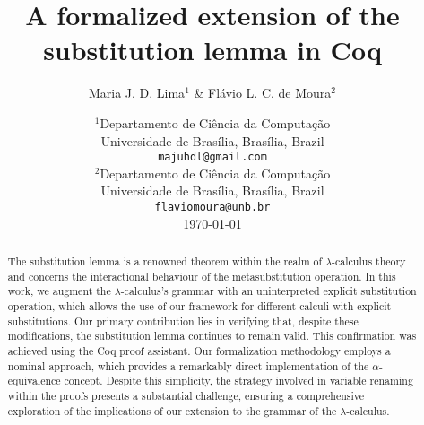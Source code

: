 \documentclass[12pt]{article}
\title{A formalized extension of the substitution lemma in Coq}
\author{Maria J. D. Lima$^1$ \&  Flávio L. C. de Moura$^2$}
\date{$^1$Departamento de Ciência da Computação \\
    Universidade de Brasília, Brasília, Brazil \\
  \texttt{majuhdl@gmail.com} \\
  $^2$Departamento de Ciência da Computação \\
    Universidade de Brasília, Brasília, Brazil \\
  \texttt{flaviomoura@unb.br} \\ \today}
\begin{document}
\maketitle

\begin{abstract}
  The substitution lemma is a renowned theorem within the realm of $\lambda$-calculus theory and concerns the interactional behaviour of the metasubstitution operation. In this work, we augment the $\lambda$-calculus's grammar with an uninterpreted explicit substitution operation, which allows the use of our framework for different calculi with explicit substitutions. Our primary contribution lies in verifying that, despite these modifications, the substitution lemma continues to remain valid. This confirmation was achieved using the Coq proof assistant. Our formalization methodology employs a nominal approach, which provides a remarkably direct implementation of the $\alpha$-equivalence concept. Despite this simplicity, the strategy involved in variable renaming within the proofs presents a substantial challenge, ensuring a comprehensive exploration of the implications of our extension to the grammar of the $\lambda$-calculus.
\end{abstract}


 




\end{document}
